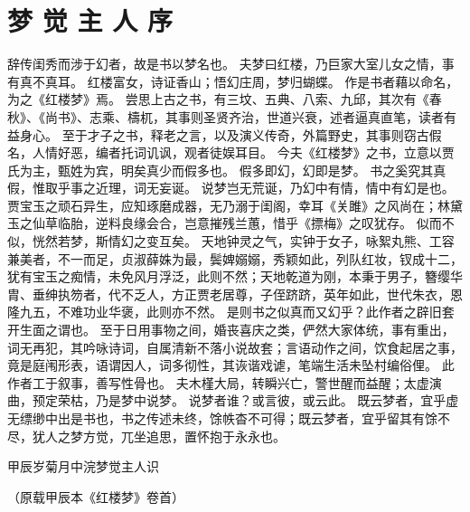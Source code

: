 \section*{梦 觉 主 人 序}
辞传闺秀而涉于幻者，故是书以梦名也。
夫梦曰红楼，乃巨家大室儿女之情，事有真不真耳。
红楼富女，诗证香山；悟幻庄周，梦归蝴蝶。
作是书者藉以命名，为之《红楼梦》焉。
尝思上古之书，有三坟、五典、八索、九邱，其次有《春秋》、《尚书》、志乘、檮杌，其事则圣贤齐治，世道兴衰，述者逼真直笔，读者有益身心。
至于才子之书，释老之言，以及演义传奇，外篇野史，其事则窃古假名，人情好恶，编者托词讥讽，观者徒娱耳目。
今夫《红楼梦》之书，立意以贾氏为主，甄姓为宾，明矣真少而假多也。
假多即幻，幻即是梦。
书之奚究其真假，惟取乎事之近理，词无妄诞。
说梦岂无荒诞，乃幻中有情，情中有幻是也。
贾宝玉之顽石异生，应知琢磨成器，无乃溺于闺阁，幸耳《关雎》之风尚在；林黛玉之仙草临胎，逆料良缘会合，岂意摧残兰蕙，惜乎《摽梅》之叹犹存。
似而不似，恍然若梦，斯情幻之变互矣。
天地钟灵之气，实钟于女子，咏絮丸熊、工容兼美者，不一而足，贞淑薛姝为最，鬓婢嫋嫋，秀颖如此，列队红妆，钗成十二，犹有宝玉之痴情，未免风月浮泛，此则不然；天地乾道为刚，本秉于男子，簪缨华胄、垂绅执笏者，代不乏人，方正贾老居尊，子侄跻跻，英年如此，世代朱衣，恩隆九五，不难功业华褒，此则亦不然。
是则书之似真而又幻乎？此作者之辟旧套开生面之谓也。
至于日用事物之间，婚丧喜庆之类，俨然大家体统，事有重出，词无再犯，其吟咏诗词，自属清新不落小说故套；言语动作之间，饮食起居之事，竟是庭闱形表，语谓因人，词多彻性，其诙谐戏谑，笔端生活未坠村编俗俚。
此作者工于叙事，善写性骨也。
夫木槿大局，转瞬兴亡，警世醒而益醒；太虚演曲，预定荣枯，乃是梦中说梦。
说梦者谁？或言彼，或云此。
既云梦者，宜乎虚无缥缈中出是书也，书之传述未终，馀帙杳不可得；既云梦者，宜乎留其有馀不尽，犹人之梦方觉，兀坐追思，置怀抱于永永也。
\par
甲辰岁菊月中浣梦觉主人识\par
（原载甲辰本《红楼梦》卷首）\par